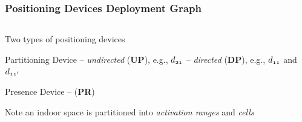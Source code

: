 \begin{frame}
\frametitle{Positioning Devices Deployment Graph}

\begin{columns}[c]

  \begin{itemize}
    \footnotesize{
    \item Two types of positioning devices
      \begin{itemize}
        \scriptsize{
        \item Partitioning Device -- \emph{undirected} (\textbf{UP}), e.g., $\mathnormal{d_{21}}$ -- \emph{directed} (\textbf{DP}), e.g., $\mathnormal{d_{11}}$ and $\mathnormal{d_{11'}}$
        \item Presence Device -- (\textbf{PR})
        }
      \end{itemize}
    \item Note an indoor space is partitioned into \emph{activation ranges} and \emph{cells}
    }
  \end{itemize}


\end{columns}
\end{frame}
